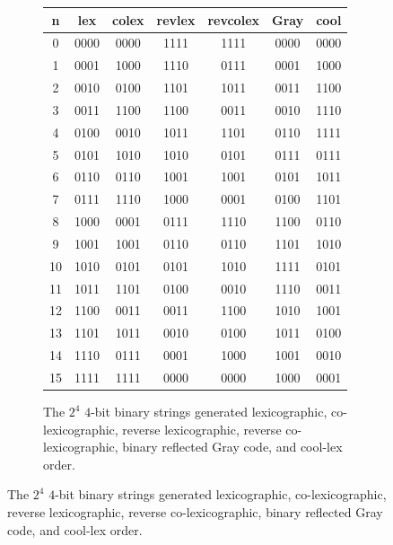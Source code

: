  \begin{figure}[]

     \begin{subfigure}[]{\textwidth}
         \begin{center}
         \caption{The $2^4$ $4$-bit binary strings generated lexicographic, co-lexicographic, reverse lexicographic, reverse co-lexicographic, binary reflected Gray code, and cool-lex order.}
             \begin{tabular}{ |c|c|c|c|c||c||c| } 
                 \hline
                 n &  lex  & colex & revlex & revcolex & Gray & cool\\  
                 \hline
                 0 & 0000 & 0000 & 1111 & 1111 & 0000   & 0000  \\
                 1 & 0001 & 1000 & 1110 & 0111 & 0001   & 1000  \\
                 2 & 0010 & 0100 & 1101 & 1011 & 0011   & 1100  \\
                 3 & 0011 & 1100 & 1100 & 0011 & 0010   & 1110  \\
                 4 & 0100 & 0010 & 1011 & 1101 & 0110   & 1111  \\
                 5 & 0101 & 1010 & 1010 & 0101 & 0111   & 0111  \\
                 6 & 0110 & 0110 & 1001 & 1001 & 0101   & 1011  \\
                 7 & 0111 & 1110 & 1000 & 0001 & 0100   & 1101  \\
                 8 & 1000 & 0001 & 0111 & 1110 & 1100   & 0110  \\
                 9 & 1001 & 1001 & 0110 & 0110 & 1101   & 1010  \\
                 10 & 1010 & 0101 & 0101 & 1010 & 1111  & 0101  \\
                 11 & 1011 & 1101 & 0100 & 0010 & 1110  & 0011  \\
                 12 & 1100 & 0011 & 0011 & 1100 & 1010  & 1001  \\
                 13 & 1101 & 1011 & 0010 & 0100 & 1011  & 0100  \\
                 14 & 1110 & 0111 & 0001 & 1000 & 1001  & 0010  \\
                 15 & 1111 & 1111 & 0000 & 0000 & 1000  & 0001  \\
                 \hline
             \end{tabular}
         \end{center}
         \label{fig:bin4}
     \end{subfigure}

\end{figure}
